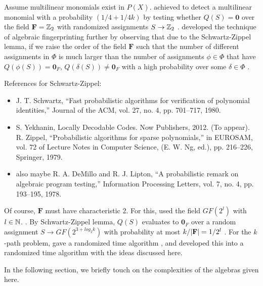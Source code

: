 Assume multilinear monomials exist in $P(X)$. 
\citeauthor{Koutis08} achieved to detect a multilinear monomial 
with a probability $(1/4 + 1/{4k})$ by testing whether 
$Q(S) = \mathbf{0}$ over the field $\mathbf{F} = \mathbb Z_2$  
with randomized assignments $S \to \mathbb Z_2$ \cite{Koutis08}. 
\citeauthor{Williams09} developed the technique of algebraic fingerprinting 
further by observing that due to the Schwartz-Zippel lemma, %
if we raise the order of the field $\mathbf{F}$ 
such that the number of different assignments in $\Phi$ is much larger than 
the number of assignments $\phi \in \Phi$ that have $Q(\phi(S)) = \mathbf{0}_F$, 
$Q(\delta(S)) \neq \mathbf{0}_F$ with a high probability over some $\delta \in \Phi$ 
\cite{Williams09}. 

\begin{anamnote}[nomargin]{}
  References for Schwartz-Zippel:
  \begin{itemize}
    \item J. T. Schwartz, “Fast probabilistic algorithms for verification of
    polynomial identities,” Journal of the ACM, vol. 27, no. 4, pp. 701–717,
    1980.
    \item  S. Yekhanin, Locally Decodable Codes. Now Publishers, 2012. (To
    appear).  R. Zippel, “Probabilistic algorithms for sparse polynomials,” in
    EUROSAM, vol. 72 of Lecture Notes in Computer Science, (E. W. Ng, ed.), pp.
    216–226, Springer, 1979.
    \item also maybe  R. A. DeMillo and R. J. Lipton, “A probabilistic remark on
    algebraic program testing,” Information Processing Letters, vol. 7, no. 4,
    pp. 193–195, 1978.
    
  \end{itemize}
\end{anamnote}

Of course, $\mathbf{F}$ must have characteristic 2. For this, \citeauthor{Williams09} 
used the field $GF(2^{l})$ with $l \in \mathbb N$. \cite{Williams09}. By Schwartz-Zippel lemma, $Q(S)$ 
evaluates to $\mathbf{0}_F$ over a random assignment $S \to GF(2^{3+log_2k})$ with probability 
at most $k/{\left\vert\mathbf{F}\right\vert} = 1/{2^l}$ \cite{Williams09}. 
For the $k$-path problem, \citeauthor{Koutis08} 
gave a randomized  time algorithm \cite{Koutis08}, 
and \citeauthor{Williams09} developed this into a randomized  
time algorithm \cite{Williams09} with the ideas discussed here.

In the following section, we briefly touch on the complexities of the 
algebras given here. 

